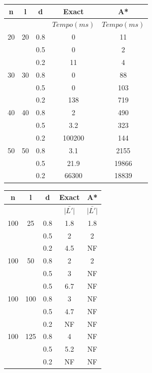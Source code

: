 \documentclass[12pt]{article}
\begin{document}
		\begin{tabular}{c|c|c|c|c} \hline
			n & l & d & Exact & A* \\ \hline
			& & & $Tempo(ms)$ & $Tempo(ms)$\\ \hline
			20 & 20 & 0.8 &  0 & 11\\
			   &    & 0.5 &  0 & 2\\
			   &    & 0.2 & 11 & 4\\ \hline
			30 & 30 & 0.8 &  0 & 88 \\
			   &    & 0.5 &  0 & 103\\
			   &    & 0.2 & 138 & 719\\ \hline
			40 & 40 & 0.8 &  2 & 490\\
			   &    & 0.5 & 3.2 & 323\\
			   &    & 0.2 & 100200 & 144\\ \hline
			50 & 50 & 0.8 & 3.1 & 2155\\
			   &    & 0.5 & 21.9 & 19866\\
			   &    & 0.2 & 66300 & 18839\\ \hline
		\end{tabular}
		
		\vspace{2cm}

		\begin{tabular}{c|c|c|c|c} \hline
			n & l & d & Exact & A* \\ \hline
			& & & $\bar{|L'|}$ & $\bar{|L'|}$ \\ \hline
			100 & 25  & 0.8 & 1.8 & 1.8\\
			   &      & 0.5 &  2 & 2\\
			   &      & 0.2 & 4.5 & NF\\ \hline
			100 & 50  & 0.8 &  2 & 2 \\
			   &      & 0.5 &  3 & NF\\
			   &      & 0.5 & 6.7 & NF\\ \hline
			100 & 100 & 0.8 &  3 & NF\\
			   &      & 0.5 & 4.7 & NF\\
			   &      & 0.2 & NF & NF\\ \hline
			100 & 125 & 0.8 & 4 & NF\\
			   &      & 0.5 & 5.2 & NF\\
			   &      & 0.2 & NF & NF\\ \hline
		\end{tabular}


		\vspace{2cm}
\end{document}
